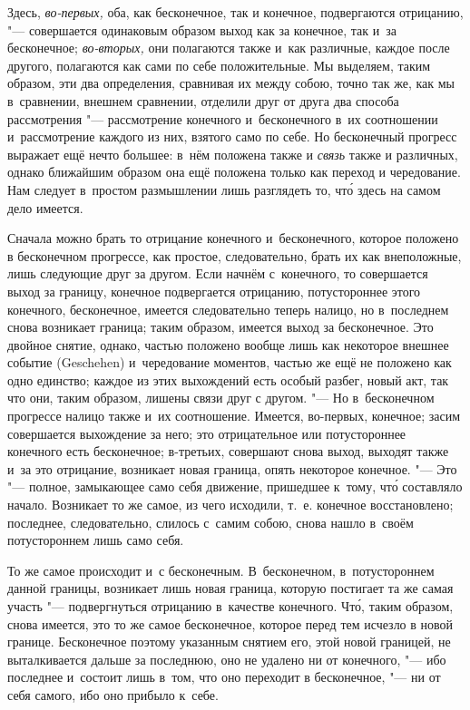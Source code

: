 Здесь, {\em во-первых,} оба, как бесконечное, так и
конечное, подвергаются отрицанию, "--- совершается одинаковым образом выход
как за конечное, так и~за бесконечное; {\em во-вторых,}
они полагаются также и~как различные, каждое после другого, полагаются как
сами по себе положительные. Мы выделяем, таким образом, эти два
определения, сравнивая их между собою, точно так же, как мы в~сравнении,
внешнем сравнении, отделили друг от друга два способа рассмотрения
"--- рассмотрение конечного и~бесконечного в~их соотношении и~рассмотрение
каждого из них, взятого само по себе. Но бесконечный прогресс выражает ещё
нечто большее: в~нём положена также и {\em связь} также
и различных, однако ближайшим образом она ещё положена только как переход и
чередование. Нам следует в~простом размышлении лишь разглядеть то, чт\'{о}
здесь на самом дело имеется.

Сначала можно брать то отрицание конечного и~бесконечного, которое положено
в бесконечном прогрессе, как простое, следовательно, брать их как
внеположные, лишь следующие друг за другом. Если начнём с~конечного, то
совершается выход за границу, конечное подвергается отрицанию,
потустороннее этого конечного, бесконечное, имеется следовательно теперь
налицо, но в~последнем снова возникает граница; таким образом, имеется
выход за бесконечное. Это двойное снятие, однако, частью положено вообще
лишь как некоторое внешнее событие (Geschehen) и~чередование моментов,
частью же ещё не положено как одно единство; каждое из этих выхождений есть
особый разбег, новый акт, так что они, таким образом, лишены связи друг с
другом. "--- Но в~бесконечном прогрессе налицо также и~их соотношение.
Имеется, во-первых, конечное; засим совершается выхождение за него; это
отрицательное или потустороннее конечного есть бесконечное; в-третьих,
совершают снова выход, выходят также и~за это отрицание, возникает новая
граница, опять некоторое конечное. "--- Это "--- полное, замыкающее само себя
движение, пришедшее к~тому, чт\'{о} составляло начало. Возникает то же самое,
из чего исходили, т.~е. конечное восстановлено; последнее, следовательно,
слилось с~самим собою, снова нашло в~своём потустороннем лишь само себя.

То же самое происходит и~с бесконечным. В~бесконечном, в~потустороннем
данной границы, возникает лишь новая граница, которую постигает та же самая
участь "--- подвергнуться отрицанию в~качестве конечного. Чт\'{о}, таким образом,
снова имеется, это то же самое бесконечное, которое перед тем исчезло в
новой границе. Бесконечное поэтому указанным снятием его, этой новой
границей, не выталкивается дальше за последнюю, оно не удалено ни от
конечного, "--- ибо последнее и~состоит лишь в~том, что оно переходит в
бесконечное, "--- ни от себя самого, ибо оно прибыло к~себе.

